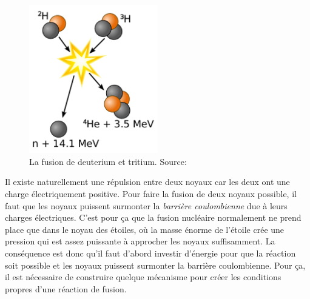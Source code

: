 \documentclass[12pt,a4paper]{article}
\begin{document}
\begin{figure}[htb]
	\centering \includegraphics[width=0.5\textwidth]{images/Deuterium-tritium_fusion}
	\caption{La fusion de deuterium et tritium. Source: \cite{fusionwiki}}
	\label{fig:deutritFusion}
\end{figure}
Il existe naturellement une répulsion entre deux noyaux car les deux ont une charge électriquement positive. Pour faire la fusion de deux noyaux possible, il faut que les noyaux puissent surmonter la \textit{barrière coulombienne} due à leurs charges électriques. C'est pour ça que la fusion nucléaire normalement ne prend place que dans le noyau des étoiles, où la masse énorme de l'étoile crée une pression qui est assez puissante à approcher les noyaux suffisamment. La conséquence est donc qu'il faut d'abord investir d'énergie pour que la réaction soit possible et les noyaux puissent surmonter la barrière coulombienne. Pour ça, il est nécessaire de construire quelque mécanisme pour créer les conditions propres d'une réaction de fusion.

\end{document}
